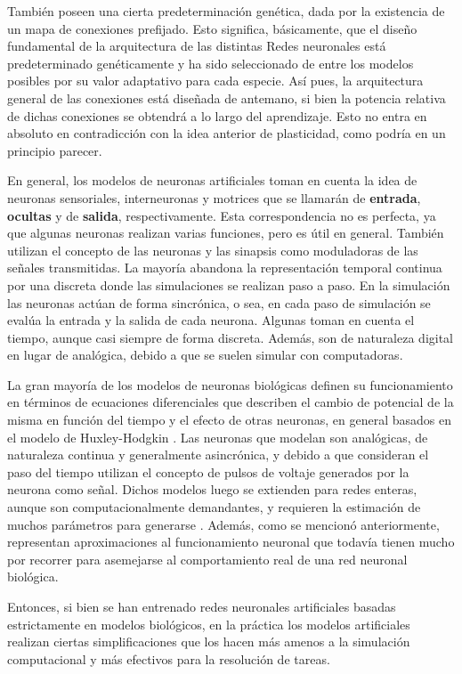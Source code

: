 También poseen una cierta predeterminación genética, dada por la existencia de un mapa de conexiones prefijado. Esto significa, básicamente, que el diseño fundamental de la arquitectura de las distintas Redes neuronales está predeterminado genéticamente y ha sido seleccionado de entre los modelos posibles por su valor adaptativo para cada especie. Así pues, la arquitectura general de las conexiones está diseñada de antemano, si bien la potencia relativa de dichas conexiones se obtendrá a lo largo del aprendizaje. Esto no entra en absoluto en contradicción con la idea anterior de plasticidad, como podría en un principio parecer.


En general, los modelos de neuronas artificiales toman en cuenta la idea de neuronas sensoriales, interneuronas y motrices que se llamarán de \textbf{entrada}, \textbf{ocultas} y de \textbf{salida}, respectivamente. Esta correspondencia no es perfecta, ya que algunas neuronas realizan varias funciones, pero es útil en general. También utilizan el concepto de las neuronas y las sinapsis como moduladoras de las señales transmitidas. La mayoría abandona la representación temporal continua por una discreta donde las simulaciones se realizan paso a paso. En la simulación las neuronas actúan de forma sincrónica, o sea, en cada paso de simulación se evalúa la entrada y la salida de cada neurona. Algunas toman en cuenta el tiempo, aunque casi siempre de forma discreta. Además, son de naturaleza digital en lugar de analógica, debido a que se suelen simular con computadoras. 



La gran mayoría de los modelos de neuronas biológicas definen su funcionamiento en términos de ecuaciones diferenciales que describen el cambio de potencial de la misma en función del tiempo y el efecto de otras neuronas, en general basados en el modelo de Huxley-Hodgkin \cite{gerstner2002,burkitt2006}. Las neuronas que modelan son analógicas, de naturaleza continua y generalmente asincrónica, y debido a que consideran el paso del tiempo utilizan el concepto de pulsos  de voltaje generados por la neurona como señal. Dichos modelos luego se extienden para redes enteras, aunque son computacionalmente demandantes, y requieren la estimación de muchos parámetros para generarse \cite{brette2007}. Además, como se mencionó anteriormente, representan aproximaciones al funcionamiento neuronal que todavía tienen mucho por recorrer para asemejarse al comportamiento real de una red neuronal biológica. 

Entonces, si bien se han entrenado redes neuronales artificiales basadas estrictamente en modelos biológicos, en la práctica los modelos artificiales realizan ciertas simplificaciones que los hacen más amenos a la simulación computacional y más efectivos para la resolución de tareas. 

